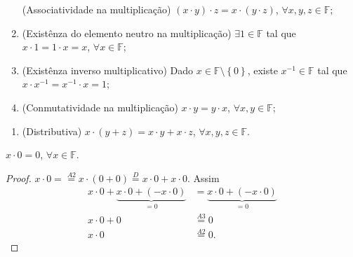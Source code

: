 \begin{definition}[Corpo]
\begin{enumerate}[label={(M\arabic*)},leftmargin=0em,itemindent=*]
		      (Associatividade na multiplicação)
		      $\left(x\cdot y\right)\cdot z=x\cdot\left(y\cdot z\right)$,
		      $\forall x,y,z\in\mathbb{F}$;


		\item\label{multiplicação:2}

		      (Existênza do elemento neutro na multiplicação)
		      $\exists 1\in\mathbb{F}$ tal que $x\cdot 1=1\cdot x=x$, $\forall x\in\mathbb{F}$;

		\item\label{multiplicação:3}

		      (Existênza inverso multiplicativo)
		      Dado $x\in\mathbb{F}\setminus\left\{0\right\}$,
		      existe $x^{-1}\in\mathbb{F}$ tal que
		      $x\cdot x^{-1}=x^{-1}\cdot x=1$;

		\item\label{multiplicação:4}

		      (Conmutatividade na multiplicação)
		      $x\cdot y=y\cdot x$, $\forall x,y\in\mathbb{F}$;
	\end{enumerate}

	\begin{enumerate}[label={(D)},leftmargin=0em,itemindent=*]
		\item\label{distributiva}

		      (Distributiva)
		      $x\cdot\left(y+z\right)=x\cdot y+x\cdot z$,
		      $\forall x,y,z\in\mathbb{F}$.
	\end{enumerate}
\end{definition}

\begin{proposition}
	$x\cdot0=0$, $\forall x\in\mathbb{F}$.
\end{proposition}

\begin{proof}
	\begin{math}
		x\cdot0=
		\overset{A2}{=}
		x\cdot\left(0+0\right)
		\overset{D}{=}
		x\cdot0+x\cdot0
	\end{math}.
	Assim
	\begin{align*}
		x\cdot0+
		\underbrace{x\cdot0+\left(-x\cdot0\right)}_{=0}
		        & =
		\underbrace{x\cdot0+\left(-x\cdot0\right)}_{=0} \\
		x\cdot0+
		0       & \overset{A3}{=}
		0                                               \\
		x\cdot0 & \overset{A2}{=}
		0.
	\end{align*}
\end{proof}

